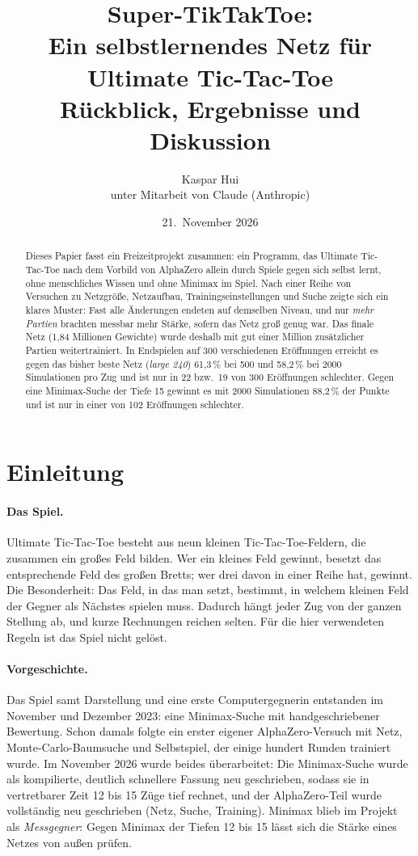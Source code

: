 \documentclass[11pt,a4paper]{article}
\title{Super-TikTakToe:\\ Ein selbstlernendes Netz für Ultimate Tic-Tac-Toe\\[0.3em]
\large Rückblick, Ergebnisse und Diskussion}
\author{Kaspar Hui\\[0.2em]\small unter Mitarbeit von Claude (Anthropic)}
\date{21.~November 2026}
\begin{document}
\maketitle

\begin{abstract}
\noindent
Dieses Papier fasst ein Freizeitprojekt zusammen: ein Programm, das Ultimate Tic-Tac-Toe nach dem Vorbild von
AlphaZero allein durch Spiele gegen sich selbst lernt, ohne menschliches Wissen und ohne Minimax im Spiel.
Nach einer Reihe von Versuchen zu Netzgröße, Netzaufbau, Trainingseinstellungen und Suche zeigte sich ein
klares Muster: Fast alle Änderungen endeten auf demselben Niveau, und nur \emph{mehr Partien} brachten
messbar mehr Stärke, sofern das Netz groß genug war. Das finale Netz (1{,}84 Millionen Gewichte) wurde
deshalb mit gut einer Million zusätzlicher Partien weitertrainiert. In Endspielen auf 300 verschiedenen
Eröffnungen erreicht es gegen das bisher beste Netz (\emph{large 240}) 61{,}3\,\% bei 500 und 58{,}2\,\% bei
2000 Simulationen pro Zug und ist nur in 22 bzw.\ 19 von 300 Eröffnungen schlechter. Gegen eine
Minimax-Suche der Tiefe 15 gewinnt es mit 2000 Simulationen 88{,}2\,\% der Punkte und ist nur in einer
von 102 Eröffnungen schlechter.
\end{abstract}

\section{Einleitung}

\paragraph{Das Spiel.} Ultimate Tic-Tac-Toe besteht aus neun kleinen Tic-Tac-Toe-Feldern, die zusammen ein
großes Feld bilden. Wer ein kleines Feld gewinnt, besetzt das entsprechende Feld des großen Bretts; wer
drei davon in einer Reihe hat, gewinnt. Die Besonderheit: Das Feld, in das man setzt, bestimmt, in
welchem kleinen Feld der Gegner als Nächstes spielen muss. Dadurch hängt jeder Zug von der ganzen
Stellung ab, und kurze Rechnungen reichen selten. Für die hier verwendeten Regeln ist das Spiel nicht
gelöst.

\paragraph{Vorgeschichte.} Das Spiel samt Darstellung und eine erste Computergegnerin entstanden im
November und Dezember 2023: eine Minimax-Suche mit handgeschriebener Bewertung. Schon damals folgte ein
erster eigener AlphaZero-Versuch mit Netz, Monte-Carlo-Baumsuche und Selbstspiel, der einige hundert
Runden trainiert wurde. Im November 2026 wurde beides überarbeitet: Die Minimax-Suche wurde als
kompilierte, deutlich schnellere Fassung neu geschrieben, sodass sie in vertretbarer Zeit 12 bis 15 Züge
tief rechnet, und der AlphaZero-Teil wurde vollständig neu geschrieben (Netz, Suche, Training). Minimax
blieb im Projekt als \emph{Messgegner}: Gegen Minimax der Tiefen 12 bis 15 lässt sich die Stärke eines
Netzes von außen prüfen.
\end{document}
